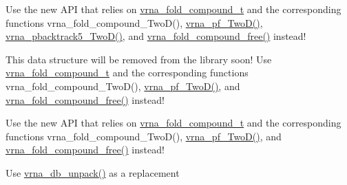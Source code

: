 \begin{DoxyRefList}
%
Use the new A\+PI that relies on \mbox{\hyperlink{group__fold__compound_ga1b0cef17fd40466cef5968eaeeff6166}{vrna\+\_\+fold\+\_\+compound\+\_\+t}} and the corresponding functions vrna\+\_\+fold\+\_\+compound\+\_\+\+Two\+D(), \mbox{\hyperlink{group__kl__neighborhood__pf_ga0bc3427689bd09da09b8b3094a27f836}{vrna\+\_\+pf\+\_\+\+Two\+D()}}, \mbox{\hyperlink{group__kl__neighborhood__stochbt_ga6504913303bc325659c365d5f59b41e0}{vrna\+\_\+pbacktrack5\+\_\+\+Two\+D()}}, and \mbox{\hyperlink{group__fold__compound_ga576a077b418a9c3650e06f8e5d296fc2}{vrna\+\_\+fold\+\_\+compound\+\_\+free()}} instead! 
\item[Class \mbox{\hyperlink{structTwoDpfold__vars}{Two\+Dpfold\+\_\+vars}} ]\label{deprecated__deprecated000006}%
%
This data structure will be removed from the library soon! Use \mbox{\hyperlink{group__fold__compound_ga1b0cef17fd40466cef5968eaeeff6166}{vrna\+\_\+fold\+\_\+compound\+\_\+t}} and the corresponding functions vrna\+\_\+fold\+\_\+compound\+\_\+\+Two\+D(), \mbox{\hyperlink{group__kl__neighborhood__pf_ga0bc3427689bd09da09b8b3094a27f836}{vrna\+\_\+pf\+\_\+\+Two\+D()}}, and \mbox{\hyperlink{group__fold__compound_ga576a077b418a9c3650e06f8e5d296fc2}{vrna\+\_\+fold\+\_\+compound\+\_\+free()}} instead!  
\item[Global \mbox{\hyperlink{2Dpfold_8h_a692243dac482a1e158a8e1b7881cfda2}{Two\+Dpfold\+List}} (\mbox{\hyperlink{structTwoDpfold__vars}{Two\+Dpfold\+\_\+vars}} $\ast$vars, int max\+Distance1, int max\+Distance2)]\label{deprecated__deprecated000009}%
%
Use the new A\+PI that relies on \mbox{\hyperlink{group__fold__compound_ga1b0cef17fd40466cef5968eaeeff6166}{vrna\+\_\+fold\+\_\+compound\+\_\+t}} and the corresponding functions vrna\+\_\+fold\+\_\+compound\+\_\+\+Two\+D(), \mbox{\hyperlink{group__kl__neighborhood__pf_ga0bc3427689bd09da09b8b3094a27f836}{vrna\+\_\+pf\+\_\+\+Two\+D()}}, and \mbox{\hyperlink{group__fold__compound_ga576a077b418a9c3650e06f8e5d296fc2}{vrna\+\_\+fold\+\_\+compound\+\_\+free()}} instead! 
\item[Global \mbox{\hyperlink{group__struct__utils__deprecated_ga071c6921efe1eb974f115ee6fefa3c39}{unpack\+\_\+structure}} (const char $\ast$packed)]\label{deprecated__deprecated000199}%
%
Use \mbox{\hyperlink{group__struct__utils__dot__bracket_ga6490adff857d84ce06e6f379ae3a4512}{vrna\+\_\+db\+\_\+unpack()}} as a replacement



\end{DoxyRefList}
